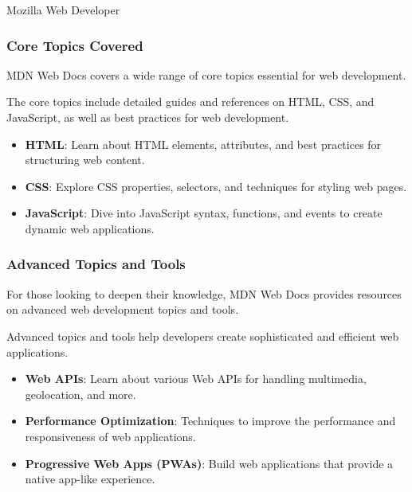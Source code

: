 \begin{notes}{Mozilla Web Developer}
    \subsubsection*{Core Topics Covered}
    
    MDN Web Docs covers a wide range of core topics essential for web development.
    
    \begin{highlight}
    
        The core topics include detailed guides and references on HTML, CSS, and JavaScript, as well as best practices for web development.
        
        \begin{itemize}
            \item \textbf{HTML}: Learn about HTML elements, attributes, and best practices for structuring web content.
            \item \textbf{CSS}: Explore CSS properties, selectors, and techniques for styling web pages.
            \item \textbf{JavaScript}: Dive into JavaScript syntax, functions, and events to create dynamic web applications.
        \end{itemize}
    
    \end{highlight}
    
    \subsubsection*{Advanced Topics and Tools}
    
    For those looking to deepen their knowledge, MDN Web Docs provides resources on advanced web development topics and tools.
    
    \begin{highlight}
    
        Advanced topics and tools help developers create sophisticated and efficient web applications.
        
        \begin{itemize}
            \item \textbf{Web APIs}: Learn about various Web APIs for handling multimedia, geolocation, and more.
            \item \textbf{Performance Optimization}: Techniques to improve the performance and responsiveness of web applications.
            \item \textbf{Progressive Web Apps (PWAs)}: Build web applications that provide a native app-like experience.
        \end{itemize}
    

\end{highlight}
\end{notes}
